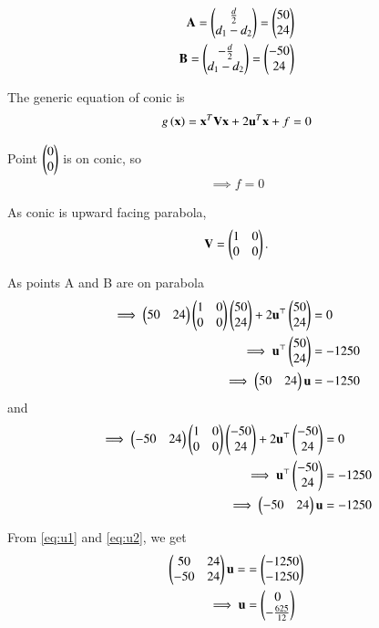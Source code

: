 \documentclass[journal,12pt,twocolumn]{IEEEtran}
\renewcommand{\vec}[1]{\boldsymbol{\mathbf{#1}}}
\begin{document}
\begin{align}
    \vec{A} = \myvec{\frac{d}{2}\\d_1-d_2} = \myvec{50\\24} \\
    \vec{B} = \myvec{-\frac{d}{2}\\d_1-d_2} = \myvec{-50\\24}
\end{align}

The generic equation of conic is
\begin{align}
    g\brak{\vec{x}} = \vec{x}^T\vec{V}\vec{x} + 2\vec{u}^T\vec{x} + f = 0 
\end{align}

Point $\begin{pmatrix}0\\0\end{pmatrix}$ is on conic, so
\begin{align}
    \implies f = 0
\end{align}

As conic is upward facing parabola,
\begin{align}
    \vec{V} = \myvec{1&0\\0&0}.
\end{align}

As points A and B are on parabola
\begin{align}
    \implies \myvec{50&24}\myvec{1&0\\0&0}\myvec{50\\24} + 2\vec{u}^\top\myvec{50\\24} &= 0\\
    \implies \vec{u}^{\top}\myvec{50\\24} &= -1250\\
    \label{eq:u1} \implies \myvec{50&24}\vec{u} &= -1250
\end{align}
and
\begin{align}
    \implies \myvec{-50&24}\myvec{1&0\\0&0}\myvec{-50\\24} + 2\vec{u}^\top\myvec{-50\\24} &= 0\\
    \implies \vec{u}^{\top}\myvec{-50\\24} &= -1250\\
    \label{eq:u2} \implies \myvec{-50&24}\vec{u} &= -1250
\end{align}

From \eqref{eq:u1} and \eqref{eq:u2}, we get
\begin{align}
    \myvec{50 & 24\\-50 & 24}\vec{u} = &= \myvec{-1250\\-1250}\\ 
    \implies \vec{u} &= \myvec{0\\-\frac{625}{12}}
\end{align} 
\end{document}
